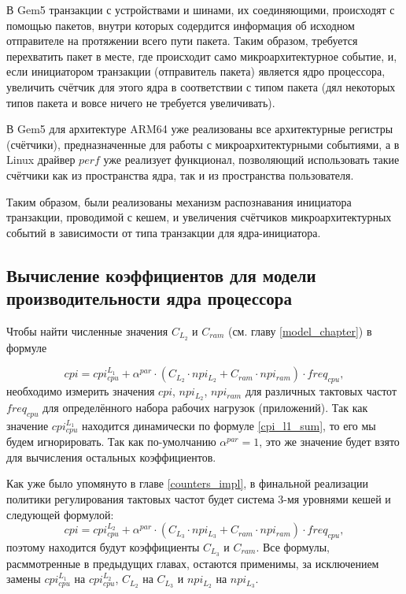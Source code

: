     В Gem5 транзакции с устройствами и шинами, их соединяющими, происходят с помощью пакетов,
    внутри которых содердится информация об исходном отправителе на протяжении всего пути
    пакета. Таким образом, требуется перехватить пакет в месте, где происходит само микроархитектурное
    событие, и, если инициатором транзакции (отправитель пакета) является ядро процессора,
    увеличить счётчик для этого ядра в соответствии с типом пакета (дял некоторых типов пакета и вовсе
    ничего не требуется увеличивать).

    В Gem5 для архитектуре ARM64 уже реализованы все архитектурные регистры (счётчики), предназначенные
    для работы с микроархитектурными событиями, а в Linux драйвер $perf$ уже реализует функционал,
    позволяющий использовать такие счётчики как из пространства ядра, так и из пространства пользователя.

    Таким образом, были реализованы механизм распознавания инициатора транзакции, проводимой
    с кешем, и увеличения счётчиков микроархитектурных событий в зависимости от типа транзакции
    для ядра-инициатора.

\subsection{Вычисление коэффициентов для модели производительности ядра процессора}

    Чтобы найти численные значения $C_{L_2}$ и $C_{ram}$ (см. главу \ref{model_chapter}) в формуле

    \begin{equation*}
        cpi = cpi_{cpu}^{L_1} + \alpha^{par} \cdot
        \left( C_{L_2} \cdot npi_{L_2} + C_{ram} \cdot npi_{ram} \right) \cdot freq_{cpu},
    \end{equation*}
    необходимо измерить значения $cpi$, $npi_{L_2}$, $npi_{ram}$ для различных тактовых частот
    $freq_{cpu}$ для определённого набора рабочих нагрузок (приложений). Так как значение $cpi_{cpu}^{L_1}$
    находится динамически по формуле \eqref{cpi_l1_sum}, то его мы будем игнорировать. Так как
    по-умолчанию $\alpha^{par} = 1$, это же значение будет взято для вычисления остальных коэффициентов.

    Как уже было упомянуто в главе \ref{counters_impl}, в финальной реализации политики регулирования тактовых
    частот будет система 3-мя уровнями кешей и следующей формулой:
    \begin{equation} \label{cpi_formula_3lvl}
        cpi = cpi_{cpu}^{L_2} + \alpha^{par} \cdot
        \left( C_{L_3} \cdot npi_{L_3} + C_{ram} \cdot npi_{ram} \right) \cdot freq_{cpu},
    \end{equation}
    поэтому находится будут коэффициенты $C_{L_3}$ и $C_{ram}$. Все формулы, расммотренные в предыдущих
    главах, остаются применимы, за исключением замены $cpi_{cpu}^{L_1}$ на $cpi_{cpu}^{L_2}$,
    $C_{L_2}$ на $C_{L_3}$ и $npi_{L_2}$ на $npi_{L_3}$.

